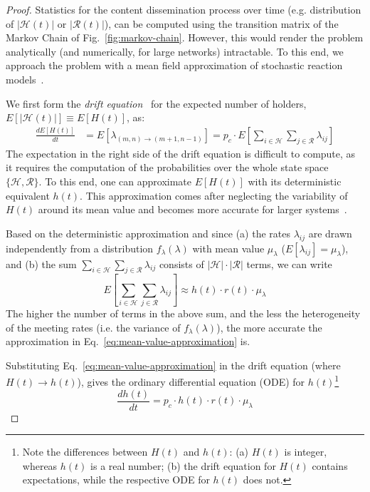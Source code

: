 \documentclass[10pt,conference,letterpaper]{IEEEtran}
\newcommand{\eq}[1]{Eq.~\eqref{#1}}
\begin{document}
\begin{proof}
Statistics for the content dissemination process over time (e.g. distribution of $|\mathcal{H}(t)|$ or $|\mathcal{R}(t)|$), can be computed using the transition matrix of the Markov Chain of Fig.~\ref{fig:markov-chain}. However, this would render the problem analytically (and numerically, for large networks) intractable. To this end, we approach the problem with a mean field approximation of stochastic reaction models~\cite{mean-field-toolbox}.

We first form the \textit{drift equation}~\cite[Theorem~1.4.1]{mean-field-toolbox} for the expected number of holders, $E\left[|\mathcal{H}(t)|\right]\equiv E\left[H(t)\right]$, as:
 \begin{align*}
 \frac{dE\left[H(t)\right]}{dt} &= E\left[\lambda_{(m,n)\rightarrow(m+1,n-1)}\right] = p_{c}\cdot E\left[\sum_{i\in\mathcal{H}}\sum_{j\in\mathcal{R}}\lambda_{ij}\right]
\end{align*}
The expectation in the right side of the drift equation is difficult to compute, as it requires the computation of the probabilities over the whole state space $\{\mathcal{H},\mathcal{R}\}$. To this end, one can approximate $E[H(t)]$ with its deterministic equivalent $h(t)$. This approximation comes after neglecting the variability of $H(t)$ around its mean value and becomes more accurate for larger systems~\cite[Section~1.5]{mean-field-toolbox}.


Based on the deterministic approximation and since (a) the rates $\lambda_{ij}$ are drawn independently from a distribution $f_{\lambda}(\lambda)$ with mean value $\mu_{\lambda}$ ($E[\lambda_{ij}]=\mu_{\lambda}$), and (b) the sum $\sum_{i\in\mathcal{H}}\sum_{j\in\mathcal{R}}\lambda_{ij}$ consists of $|\mathcal{H}|\cdot |\mathcal{R}|$ terms, we can write
\begin{equation}\label{eq:mean-value-approximation}
 \textstyle E\left[\sum_{i\in\mathcal{H}}\sum_{j\in\mathcal{R}}\lambda_{ij}\right] \approx h(t)\cdot r(t)\cdot \mu_{\lambda}
\end{equation}
The higher the number of terms in the above sum, and the less the heterogeneity of the meeting rates (i.e. the variance of $f_{\lambda}(\lambda)$), the more accurate the approximation in \eq{eq:mean-value-approximation} is.

Substituting \eq{eq:mean-value-approximation} in the drift equation (where $H(t)\rightarrow h(t)$), gives the ordinary differential equation (ODE) for $h(t)$\footnote{Note the differences between $H(t)$ and $h(t)$: (a) $H(t)$ is integer, whereas $h(t)$ is a real number; (b) the drift equation for $H(t)$ contains expectations, while the respective ODE for $h(t)$ does not.}
\begin{equation}\label{eq:ODE-h(t)}
 \frac{dh(t)}{dt} = p_{c}\cdot h(t)\cdot r(t)\cdot \mu_{\lambda}
\end{equation}


\end{proof}
\end{document}
